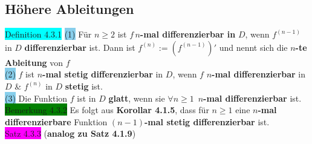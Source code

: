 \documentclass[landscape, 10pt]{article}
\begin{document}
\begin{multicols}{3}
       \subsection{Höhere Ableitungen}
              \colorbox{cyan}{Definition 4.3.1} 
                     \colorbox{SkyBlue}{(1)}
                            Für $n\geqslant2$ ist 
                            $f\,n$\textbf{-mal differenzierbar 
                            in} $D$, wenn 
                            \textcolor{NavyBlue}{
                            $f^{(n-1)}$} in 
                            \textcolor{NavyBlue}{$D$}
                            \textbf{differenzierbar} ist. 
                            Dann ist 
                            \textcolor{NavyBlue}{
                            $f^{(n)}:=(f^{(n-1)})'$} 
                            und nennt sich die 
                            $n$\textbf{-te Ableitung} von 
                            \textcolor{NavyBlue}{$f$}\\
                     \colorbox{SkyBlue}{(2)} 
                            \textcolor{NavyBlue}{$f$} 
                            ist $n$\textbf{-mal stetig 
                            differenzierbar} in 
                            \textcolor{NavyBlue}{$D$}, 
                            wenn \textcolor{NavyBlue}{$f$} 
                            \textbf{$n$-mal differenzierbar} in
                            \textcolor{NavyBlue}{$D$}
                            \& \textcolor{NavyBlue}{$f^{(n)}$} 
                            in \textcolor{NavyBlue}{$D$} 
                            \textbf{stetig} ist.\\
                     \colorbox{SkyBlue}{(3)} 
                            Die Funktion \textcolor{NavyBlue}{$f$} 
                            ist in \textcolor{NavyBlue}{$D$} 
                            \textbf{glatt}, wenn sie 
                            \textcolor{NavyBlue}{
                            $\forall n\geqslant1$}\,
                            \textbf{$n$-mal 
                            differenzierbar} ist.\\
              \colorbox{green}{Bemerkung 4.3.2} 
                     Es folgt aus \textbf{Korollar 4.1.5}, 
                     dass für 
                     \textcolor{NavyBlue}{$n\geqslant1$} eine 
                     \textbf{$n$-mal differenzierbare}
                     Funktion \textbf{$(n-1)$-mal 
                     stetig differenzierbar} ist.\\
              \colorbox{magenta}{Satz 4.3.3} 
              (\textbf{analog zu Satz 4.1.9}) 

\end{multicols}
\end{document}
